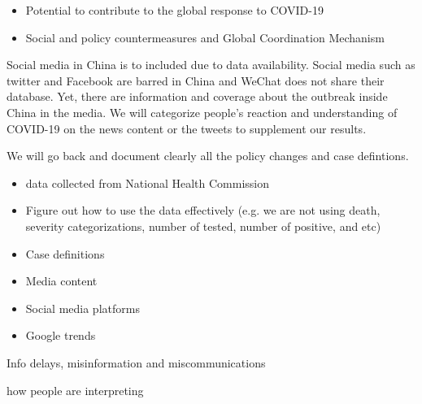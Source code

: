 \begin{itemize}
\item{Potential to contribute to the global response to COVID-19}
\item{Social and policy countermeasures and Global Coordination Mechanism}
\end{itemize}


Social media in China is to included due to data availability.   Social media such as twitter and Facebook are barred in China and WeChat does not share their database. Yet, there are information and coverage about the outbreak inside China in the media.  We will categorize people’s reaction and understanding of COVID-19  on the news content or the tweets to supplement our results.




We will go back and document clearly all the policy changes and case defintions. 

\begin{itemize}
\item{data collected from National Health Commission}
\item{Figure out how to use the data effectively (e.g. we are not using death, severity categorizations, number of tested, number of positive, and etc)}
\item{Case definitions}
\item{Media content}
\item{Social media platforms}
\item{Google trends}
\end{itemize}


Info delays, misinformation and miscommunications


how people are interpreting 

